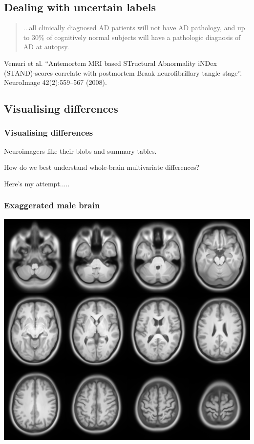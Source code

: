 
\subsection{Dealing with uncertain labels}
\begin{frame}
\begin{quote}
...all clinically diagnosed AD patients will not have AD pathology, and up to 30\% of cognitively normal subjects will have a pathologic diagnosis of AD at autopsy.
\end{quote}

\begin{center}\begin{tiny}
Vemuri et al. ``Antemortem MRI based STructural Abnormality iNDex (STAND)-scores correlate with postmortem Braak neurofibrillary tangle stage''. NeuroImage 42(2):559--567 (2008).

\end{tiny}\end{center}
\end{frame}


\subsection{Visualising differences}

\begin{frame}
\frametitle{Visualising differences}
Neuroimagers like their blobs and summary tables.

How do we best understand whole-brain multivariate differences?

Here's my attempt.....
\end{frame}



\begin{frame}
\frametitle{Exaggerated male brain}
\begin{center}
\includegraphics[width=.7\textwidth]{hyper_male}
\end{center}
\end{frame}



